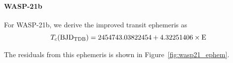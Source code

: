 \paragraph{WASP-21b}
For WASP-21b, we derive the improved transit ephemeris as
\begin{equation}
T_c(\rm{BJD_{TDB}})= 2454743.03822454+4.32251406 \times E
\end{equation}

The residuals from this ephemeris%
is shown in Figure~\ref{fig:wasp21_ephem}.

